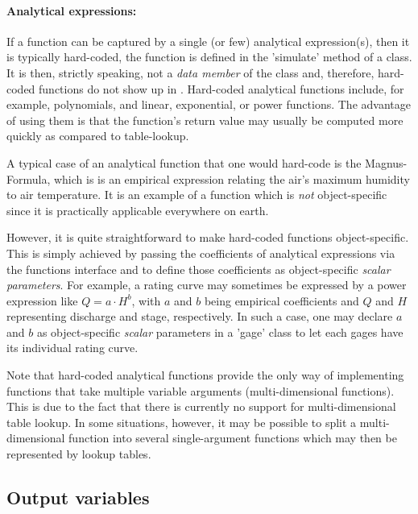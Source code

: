 \paragraph{Analytical expressions:} If a function can be captured by a single (or few) analytical expression(s), then it is typically hard-coded, \ie{} the function is defined in the 'simulate' method of a class. It is then, strictly speaking, not a \emph{data member} of the class and, therefore, hard-coded functions do not show up in . Hard-coded analytical functions include, for example, polynomials, and linear, exponential, or power functions. The advantage of using them is that the function's return value may usually be computed more quickly as compared to table-lookup.

A typical case of an analytical function that one would hard-code is the Magnus-Formula, which is is an empirical expression relating the air's maximum humidity to air temperature. It is an example of a function which is \emph{not} object-specific since it is practically applicable everywhere on earth.

However, it is quite straightforward to make hard-coded functions object-specific. This is simply achieved by passing the coefficients of analytical expressions via the functions interface and to define those coefficients as object-specific \emph{scalar parameters}. For example, a rating curve may sometimes be expressed by a power expression like $Q=a \cdot H^b$, with $a$ and $b$ being empirical coefficients and $Q$ and $H$ representing discharge and stage, respectively. In such a case, one may declare $a$ and $b$ as object-specific \emph{scalar} parameters in a 'gage' class to let each gages have its individual rating curve.

Note that hard-coded analytical functions provide the only way of implementing functions that take multiple variable arguments (multi-dimensional functions). This is due to the fact that there is currently no support for multi-dimensional table lookup. In some situations, however, it may be possible to split a multi-dimensional function into several single-argument functions which may then be represented by lookup tables.

\subsection{Output variables} \label{sec:concept-classFeatures-outputs}

